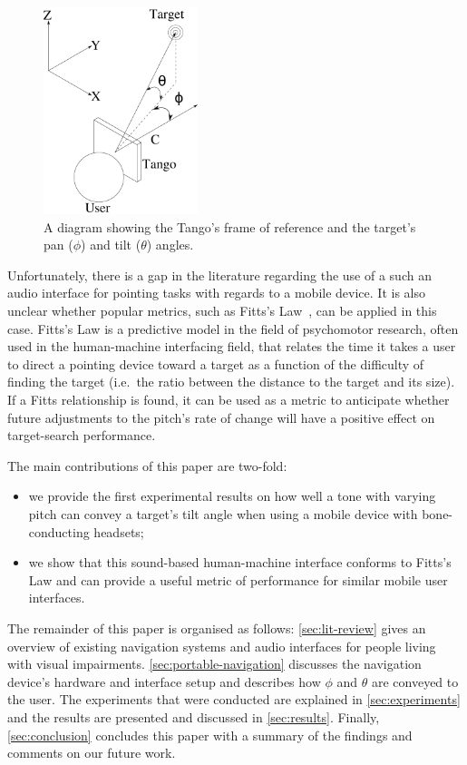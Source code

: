 \documentclass[sigconf, review=true, screen=true, anonymous=true]{acmart}
\begin{document}
\begin{figure}
  \centering
  \includegraphics[width=0.4\textwidth]{figures/camera_coordinate.pdf}
  \caption{A diagram showing the Tango's frame of reference and the target's pan ($\phi$) and tilt ($\theta$) angles.}\label{fig:cam-coords}
\end{figure}

Unfortunately, there is a gap in the literature regarding the use of a such an audio interface for pointing tasks with regards to a mobile device.
It is also unclear whether popular metrics, such as Fitts's Law~\cite{fitts1954information}, can be applied in this case.
Fitts's Law is a predictive model in the field of psychomotor research, often used in the human-machine interfacing field, that relates the time it takes a user to direct a pointing device toward a target as a function of the difficulty of finding the target (i.e.\ the ratio between the distance to the target and its size).
If a Fitts relationship is found, it can be used as a metric to anticipate whether future adjustments to the pitch's rate of change will have a positive effect on target-search performance.

The main contributions of this paper are two-fold: 

\begin{itemize}
  \item we provide the first experimental results on how well a tone with varying pitch can convey a target's tilt angle when using a mobile device with bone-conducting headsets; 
  \item we show that this sound-based human-machine interface conforms to Fitts's Law and can provide a useful metric of performance for similar mobile user interfaces.
\end{itemize}

The remainder of this paper is organised as follows: \cref{sec:lit-review} gives an overview of existing navigation systems and audio interfaces for people living with visual impairments.
\cref{sec:portable-navigation} discusses the navigation device's hardware and interface setup and describes how $\phi$ and $\theta$ are conveyed to the user.
The experiments that were conducted are explained in \cref{sec:experiments} and the results are presented and discussed in \cref{sec:results}. 
Finally, \cref{sec:conclusion} concludes this paper with a summary of the findings and comments on our future work. 
\end{document}
